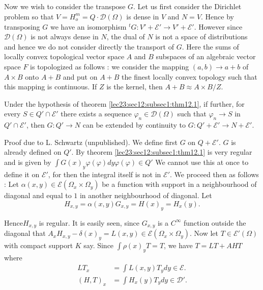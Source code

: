 \subsection{}\label{lec23:sec12:subsec2}

Now we wish to consider the transpose $G$. Let us first consider the
Dirichlet problem so that $V = H^m_o = Q \cdot \mathscr{D}
(\Omega)$ is dense in $V$ and $N =V$. Hence by transposing $G$ we have
an isomorphism $^t G : V' + \mathscr{E}' \to V' +
\mathscr{E}'$. However since $\mathscr{D}(\Omega)$ is not always dense
in $N$, the dual of $N$ is not a space of distributions and hence we
do not consider directly the transport of $G$. Here the sums of
locally convex topological vector space $A$ and $B$ subspaces of an
algebraic vector space $F$ is topologized as follows : we consider the
mapping $(a, b) \to a+ b$ of $A \times B$  onto $A+B$ and put on $A +
B$ the finest locally convex topology such that this mapping is
continuous. If $Z$ is the kernel, then $A + B \approx A \times B / Z$. 

\begin{theorem}\label{lec23:sec12:subsec2:thm12.3}%
  Under the hypothesis of theorem \ref{lec23:sec12:subsec1:thm12.1}, if further, for every $S
  \in Q' \cap \mathscr{E}'$ there exists a sequence $\varphi_n
  \in \mathscr{D} (\Omega)$ such that $\varphi_n \to S$ in $Q'
  \cap \mathscr{E}'$, then $G : Q' \to N$ can be extended by continuity
  to $G : Q'  + \mathscr{E}' \to N + \mathscr{E}'$. 
\end{theorem}

\noindent Proof due to L. Schwartz (unpublished). 
We define first $G$ on $Q + \mathscr{E}'$. $G$ is already defined on
$Q'$. By theorem \ref{lec23:sec12:subsec1:thm12.1} is very regular and is given by $\int G
(x)_y \varphi (\varphi) dy \varphi (\varphi) \in Q'$ We cannot
use this at once to define it on $\mathscr{E}'$, for then the
integral itself is not in $\mathscr{E}'$. We proceed then as follows :
Let $\alpha (x, y) \in \mathscr{E} (\Omega_x \times \Omega_y)$
be a function with support in a neighbourhood of diagonal and equal to
$1$ in another neighbourhood of diagonal. Let 
$$
H_{x, y} = \alpha(x, y)G_{x, y} = H(x)_y = H_x (y).
$$

Hence\pageoriginale $H_{x, y}$ is regular. It is easily seen, since $G_{x, y}$ is a
$C^\infty$ function outside the diagonal that $A_x H_{x, y} - \delta
(x)_y = L (x, y) \in \mathscr{E} (\Omega_x \times
\Omega_y)$. Now let $T \in \mathscr{E}' (\Omega)$ with compact
support $K$ say. Since $\int\rho(x)_y T= T$, we have $T = LT + AHT$ where 
\begin{align*}
LT_x & = \int L (x, y) T_y dy \in \mathscr{E}.\\
(H, T)_x & = \int H_x (y) T_y dy \in \mathscr{D}'.
\end{align*}

